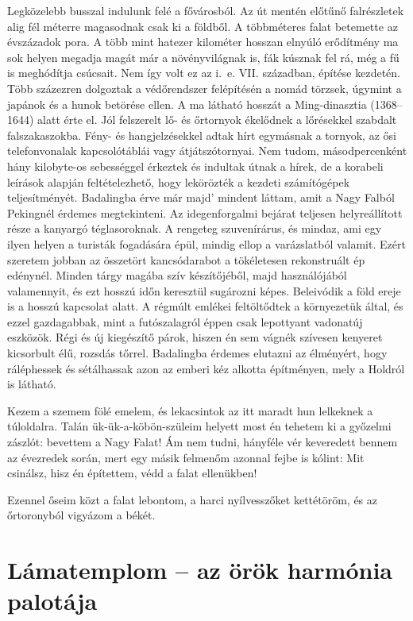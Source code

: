 Legközelebb busszal indulunk felé a fővárosból. Az út mentén előtűnő
falrészletek alig fél méterre magasodnak csak ki a földből. A többméteres
falat betemette az évszázadok pora. A több mint hatezer kilométer
hosszan elnyúló erődítmény ma sok helyen megadja magát már a növényvilágnak
is, fák kúsznak fel rá, még a fű is meghódítja csúcsait. Nem így
volt ez az i.~e. VII. században, építése kezdetén. Több százezren dolgoztak
a védőrendszer felépítésén a nomád törzsek, úgymint a japánok és a hunok
betörése ellen. A ma látható hosszát a Ming-dinasztia (1368--1644)
alatt érte el. Jól felszerelt lő- és őrtornyok ékelődnek a lőrésekkel
szabdalt falszakaszokba. Fény- és hangjelzésekkel adtak hírt egymásnak a
tornyok, az ősi telefonvonalak kapcsolótáblái vagy átjátszótornyai. Nem
tudom, másodpercenként hány kilobyte-os sebességgel érkeztek és indultak
útnak a hírek, de a korabeli leírások alapján feltételezhető, hogy
lekörözték a kezdeti számítógépek teljesítményét. Badalingba érve már
majd' mindent láttam, amit a Nagy Falból Pekingnél érdemes megtekinteni.
Az idegenforgalmi bejárat teljesen helyreállított része a kanyargó
téglasoroknak. A rengeteg szuvenírárus, és mindaz, ami egy ilyen helyen
a turisták fogadására épül, mindig ellop a varázslatból valamit. Ezért
szeretem jobban az összetört kancsódarabot a tökéletesen rekonstruált
ép edénynél. Minden tárgy magába szív készítőjéből, majd használójából
valamennyit, és ezt hosszú időn keresztül sugározni képes. Beleivódik
a föld ereje is a hosszú kapcsolat alatt. A régmúlt emlékei feltöltődtek a
környezetük által, és ezzel gazdagabbak, mint a futószalagról éppen csak
lepottyant vadonatúj eszközök. Régi és új kiegészítő párok, hiszen én
sem vágnék szívesen kenyeret kicsorbult élű, rozsdás tőrrel. Badalingba
érdemes elutazni az élményért, hogy ráléphessek és sétálhassak azon az
emberi kéz alkotta építményen, mely a Holdról is látható.

Kezem a szemem fölé emelem, és lekacsintok az itt maradt hun lelkeknek
a túloldalra. Talán ük-ük-a-köbön-szüleim helyett most én tehetem ki
a győzelmi zászlót: bevettem a Nagy Falat! Ám nem tudni, hányféle vér
keveredett bennem az évezredek során, mert egy másik felmenőm azonnal
fejbe is kólint: Mit csinálsz, hisz én építettem, védd a falat ellenükben!

\begin{itshape}
Ezennel őseim közt a falat lebontom, a harci nyílvesszőket kettétöröm,
és az őrtoronyból vigyázom a békét.
\end{itshape}

\section{Lámatemplom -- az örök harmónia palotája}

